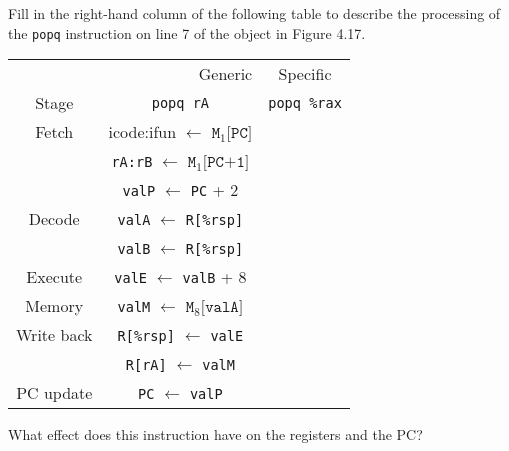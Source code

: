 \documentclass[12pt]{article}
\newenvironment{ex}[2][Exercise]{\begin{trivlist}
		\item[\hskip \labelsep {\bfseries #1}\hskip \labelsep {\bfseries #2.}]}{\end{trivlist}}
\begin{document}
\begin{ex}{4.14}
	Fill in the right-hand column of the following table to describe the processing
	of the \texttt{popq} instruction on line 7 of the object in Figure 4.17.
	\begin{center}
		\begin{tabular}{ccc}
			\multicolumn{2}{r}{Generic} & Specific\\
			Stage & \texttt{popq rA} & \texttt{popq \%rax}\\
			\hline
			Fetch &  icode:ifun $\leftarrow$ $\texttt{M}_1\texttt{[PC]}$ & {}\\
			{} & \texttt{rA:rB} $ \leftarrow$ $\texttt{M}_1\texttt{[PC+1]}$ & {}\\
			{} & \texttt{valP} $ \leftarrow$ \texttt{PC} + 2 & \\
			Decode & \texttt{valA}  $\leftarrow$ \texttt{R[\%rsp]} & {}\\
			{} & \texttt{valB}  $\leftarrow$ \texttt{R[\%rsp]} & {}\\
			Execute & \texttt{valE} $\leftarrow$  \texttt{valB} + 8 & {}\\
			Memory & \texttt{valM} $\leftarrow$ $\texttt{M}_8\texttt{[valA]}$ & {}\\
			Write back & \texttt{R[\%rsp]} $ \leftarrow$ \texttt{valE} & \\
			{} & \texttt{R[rA]} $\leftarrow$ \texttt{valM}&{}\\
			PC update & \texttt{PC} $\leftarrow$ \texttt{valP}
		\end{tabular}
	\end{center}
	What effect does this instruction have on the registers and the PC?
\end{ex}
\end{document}
